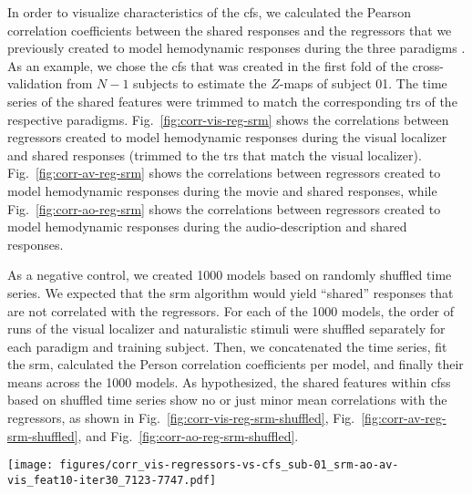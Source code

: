 In order to visualize characteristics of the \ac{cfs}, we calculated the Pearson
correlation coefficients between the shared responses and the regressors that we
previously created to model hemodynamic responses during the three paradigms
\citep[cf.][]{sengupta2016extension, haeusler2022processing}.
%
As an example, we chose the \ac{cfs} that was created in the first fold of the
cross-validation from $N-1$ subjects to estimate the $Z$-maps of subject 01.
%
The time series of the shared features were trimmed to match the corresponding
\acp{tr} of the respective paradigms.
%
Fig.~\ref{fig:corr-vis-reg-srm} shows the correlations between regressors
created to model hemodynamic responses during the visual localizer and shared
responses (trimmed to the \acp{tr} that match the visual localizer).
Fig.~\ref{fig:corr-av-reg-srm} shows the correlations between regressors created
to model hemodynamic responses during the movie \citep[cf. Table 3
in][]{haeusler2022processing} and shared responses, while
Fig.~\ref{fig:corr-ao-reg-srm} shows the correlations between regressors created
to model hemodynamic responses during the audio-description \citep[cf. Table 3
in][]{haeusler2022processing} and shared responses.




As a negative control, we created 1000 models based on randomly shuffled time
series.
%
We expected that the \ac{srm} algorithm would yield ``shared'' responses that
are not correlated with the regressors.
%
For each of the 1000 models, the order of runs of the visual localizer and
naturalistic stimuli were shuffled separately for each paradigm and training
subject.
%
Then, we concatenated the time series, fit the \ac{srm}, calculated the Person
correlation coefficients per model, and finally their means across the 1000
models.
%
As hypothesized, the shared features within \acp{cfs} based on shuffled time
series show no or just minor mean correlations with the regressors, as shown in
%
Fig.~\ref{fig:corr-vis-reg-srm-shuffled},
%
Fig.~\ref{fig:corr-av-reg-srm-shuffled}, and
%
Fig.~\ref{fig:corr-ao-reg-srm-shuffled}.


\begin{figure*}[tbp]
\centering
\texttt{[image: figures/corr\_vis-regressors-vs-cfs\_sub-01\_srm-ao-av-vis\_feat10-iter30\_7123-7747.pdf]}
\caption{
%
\textbf{Pearson correlation coefficients between regressors of the visual
localizer and shared features.}
%
The time series of the shared features within the multi-paradigm \ac{cfs}
%
(as calculated for subject 01 in the first fold of the cross-validation)
%
were trimmed to match the corresponding \acp{tr} of the visual localizer
paradigm \citep{sengupta2016extension}.
%
The six regressors of the visual localizer model hemodynamic responses to
the six categories of pictures that were presented in blocks.
}
\label{fig:corr-vis-reg-srm}
\end{figure*}


